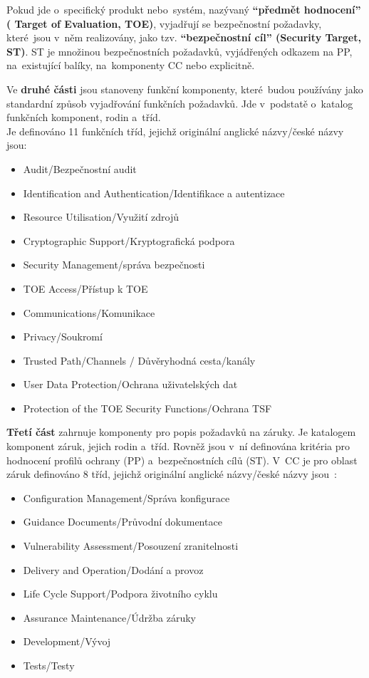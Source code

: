 \documentclass[a4paper,12pt]{article}
\renewcommand{\b}[1]{\textbf{#1}} %
\begin{document}
Pokud jde o~specifický produkt nebo~systém, nazývaný \b{“předmět hodnocení” ( Target of Evaluation, TOE)}, vyjadřují se bezpečnostní požadavky, které~jsou v~něm realizovány, jako tzv. \b{“bezpečnostní cíl” (Security Target, ST)}. ST je množinou bezpečnostních požadavků, vyjádřených odkazem na PP, na~existující balíky, na~komponenty CC nebo explicitně.~\cite{NBUHodnoceniBezpecnostiSW}

Ve \b{druhé části} jsou stanoveny funkční komponenty, které~budou používány jako standardní způsob vyjadřování funkčních požadavků. Jde v~podstatě o~katalog funkčních komponent, rodin a~tříd.~\cite{NBUHodnoceniBezpecnostiSW}\\
Je definováno 11 funkčních tříd, jejichž originální anglické názvy/české názvy jsou:
\begin{itemize}
 \item Audit/Bezpečnostní audit
 \item Identification and Authentication/Identifikace a autentizace
 \item Resource Utilisation/Využití zdrojů
 \item Cryptographic Support/Kryptografická podpora
 \item Security Management/správa bezpečnosti
 \item TOE Access/Přístup k TOE
 \item Communications/Komunikace
 \item Privacy/Soukromí
 \item Trusted Path/Channels / Důvěryhodná cesta/kanály
 \item User Data Protection/Ochrana uživatelských dat
 \item Protection of the TOE Security Functions/Ochrana TSF
\end{itemize}

\b{Třetí část} zahrnuje komponenty pro popis požadavků na záruky. Je katalogem komponent záruk, jejich rodin a~tříd. Rovněž jsou v~ní definována kritéria pro hodnocení profilů ochrany (PP) a~bezpečnostních cílů (ST). V~CC je pro oblast záruk definováno 8 tříd, jejichž originální anglické názvy/české názvy jsou~\cite{NBUHodnoceniBezpecnostiSW}:
\begin{itemize}
 \item Configuration Management/Správa konfigurace
 \item Guidance Documents/Průvodní dokumentace
 \item Vulnerability Assessment/Posouzení zranitelnosti
 \item Delivery and Operation/Dodání a provoz
 \item Life Cycle Support/Podpora životního cyklu
 \item Assurance Maintenance/Údržba záruky
 \item Development/Vývoj
 \item Tests/Testy
\end{itemize}
\end{document}
